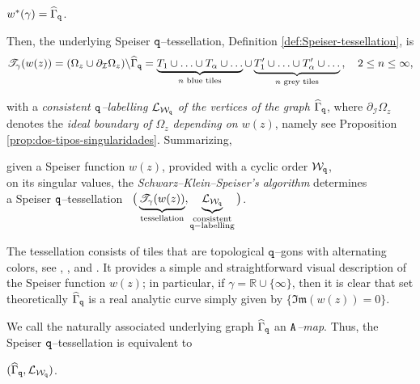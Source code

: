 \documentclass[final,3p,times]{elsarticle}
\newcommand{\RR}{\ensuremath{{\mathbb R}}}
\renewcommand{\Im}[1]{{\mathfrak{Im}\left(#1\right)}}
\theoremstyle{definition}
\begin{document}
\centerline{$w^*(\gamma) = \widehat{\Gamma}_{\tt q}$. }

\noindent 
Then, the underlying Speiser $\tt q$--tessellation, 
Definition \ref{def:Speiser-tessellation}, is
\begin{equation*}
\mathscr{T}_\gamma(w(z))
=
(\Omega_z \cup \partial_{\mathcal{I}} \Omega_z )
\backslash \widehat{\Gamma}_{\tt q} 
=
\underbrace{
T_1 \cup \ldots \cup T_\alpha \cup \ldots  }_{ n\text{ blue tiles} }
\cup 
\underbrace{ T^\prime_1 \cup  
\ldots  \cup T^{\prime}_\alpha  \cup \ldots }_{n \text{ grey tiles}}\, , 
\ \ \ 
2 \leq n \leq \infty,
\end{equation*}

\noindent
with a 
\emph{consistent $\tt q$--labelling 
$\mathcal{L}_{\mathcal{W}_{\tt q}}$ of the vertices of
the graph $\widehat{\Gamma}_{\tt q}$}, 
where  
$\partial_{\mathcal{I}} \Omega_z $ denotes the 
\emph{ideal boundary of $\Omega_z$ depending on $w(z)$}, namely
see Proposition \ref{prop:dos-tipos-singularidades}.
Summarizing, 


{\it
\begin{center}
given a Speiser function $w(z)$,
provided with a cyclic order  
$\mathcal{W}_{\tt q}$,
\\
on its singular values,
the \emph{Schwarz--Klein--Speiser's algorithm}
determines 
\\
a Speiser $\tt q$--tessellation \
$
\big( \underbrace{ \mathscr{T}_\gamma(w(z)) }_{\text{tessellation}}, 
\underbrace{ \mathcal{L}_{\mathcal{W}_{\tt q}} }_{\substack{ \text{consistent}\\
{\tt q}-\text{labelling}} }  \big) 
$.
\end{center}
}

\noindent
The tessellation consists of tiles that are topological 
$\tt q$--gons with alternating colors, see
\cite{Chislenko-Tschinkel}, 
\cite{Koch-Lei}, 
\cite{GonzalezMucino} and
\cite{AlvarezGutierrezMucino}. 
It provides a simple and
straightforward visual description of the Speiser function
$w(z)$;
in particular,
if $\gamma=\RR\cup\{\infty\}$, then
it is clear that set theoretically
$\widehat{\Gamma}_{\tt q} $ 
is a real analytic curve simply given by $\{\Im{w(z)}=0\}$.


\noindent
We call the naturally associated underlying graph 
$\widehat{\Gamma}_{\tt q}$ an \emph{$\tt A$--map}.
Thus, the Speiser $\tt q$--tessellation is equivalent to 

\centerline{
$(\widehat{\Gamma}_{\tt q}, \mathcal{L}_{\mathcal{W}_{\tt q}})$.
}
\end{document}
